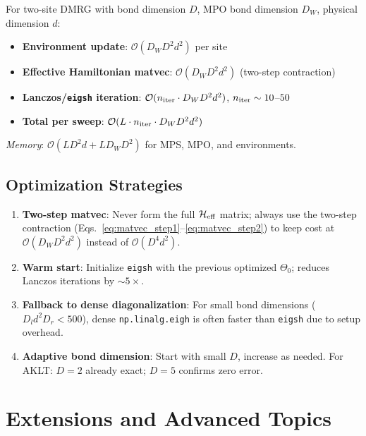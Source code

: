 \documentclass[aps,prb,onecolumn,scriptaddress]{revtex4-2}
\newcommand{\Order}{\mathcal{O}}
\begin{document}
	For two-site DMRG with bond dimension $D$, MPO bond dimension $D_W$,
	physical dimension $d$:
	
	\begin{itemize}
		\item \textbf{Environment update}: $\Order(D_W D^2 d^2)$ per site
		\item \textbf{Effective Hamiltonian matvec}: $\Order(D_W D^2 d^2)$
		(two-step contraction)
		\item \textbf{Lanczos/\texttt{eigsh} iteration}: $\Order(n_{\rm iter}
		\cdot D_W D^2 d^2)$, $n_{\rm iter} \sim 10$--$50$
		\item \textbf{Total per sweep}: $\Order(L \cdot n_{\rm iter}
		\cdot D_W D^2 d^2)$
	\end{itemize}
	
	\textit{Memory}: $\Order(L D^2 d + L D_W D^2)$ for MPS, MPO, and environments.
	
	\subsection{Optimization Strategies}
	
	\begin{enumerate}
		\item \textbf{Two-step matvec}: Never form the full $\mathcal{H}_{\rm eff}$
		matrix; always use the two-step contraction
		(Eqs.~\eqref{eq:matvec_step1}--\eqref{eq:matvec_step2})
		to keep cost at $\Order(D_W D^2 d^2)$ instead of $\Order(D^4 d^2)$.
		
		\item \textbf{Warm start}: Initialize \texttt{eigsh} with the previous
		optimized $\Theta_0$; reduces Lanczos iterations by $\sim 5\times$.
		
		\item \textbf{Fallback to dense diagonalization}: For small bond dimensions
		($D_l d^2 D_r < 500$), dense \texttt{np.linalg.eigh} is often faster
		than \texttt{eigsh} due to setup overhead.
		
		\item \textbf{Adaptive bond dimension}: Start with small $D$, increase
		as needed. For AKLT: $D=2$ already exact; $D=5$ confirms zero error.
	\end{enumerate}
	
	\clearpage
	\section{Extensions and Advanced Topics}
	
\end{document}
